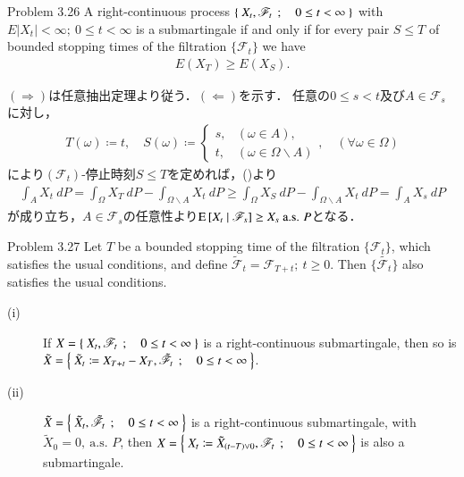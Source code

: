 	\begin{itembox}[l]{Problem 3.26}
		A right-continuous process $\left\{\ X_t,\mathscr{F}_t\ \, ; \quad 0 \leq t < \infty\ \right\}$ with $E|X_t| < \infty;\ 0 \leq t < \infty$
		is a submartingale if and only if for every pair $S \leq T$ of bounded stopping times of 
		the filtration $\{\mathscr{F}_t\}$ we have
		\begin{align}
			E(X_T) \geq E(X_S).
			\label{chapter_1_Problem_3_26_1}
		\end{align}
	\end{itembox}
	
	\begin{prf}
		$(\Rightarrow)$は任意抽出定理より従う．$(\Leftarrow)$を示す．
		任意の$0 \leq s < t$及び$A \in \mathscr{F}_s$に対し，
		\begin{align}
			T(\omega) \coloneqq t,
			\quad 
			S(\omega) \coloneqq
			\begin{cases}
				s, & (\omega \in A), \\
				t, & (\omega \in \Omega \backslash A)
			\end{cases},
			\quad (\forall \omega \in \Omega)
		\end{align}
		により$(\mathscr{F}_t)$-停止時刻$S \leq T$を定めれば，()より
		\begin{align}
			\int_A X_t\ dP = \int_\Omega X_T\ dP - \int_{\Omega \backslash A} X_t\ dP
			\geq \int_\Omega X_S\ dP - \int_{\Omega \backslash A} X_t\ dP
			= \int_A X_s\ dP
		\end{align}
		が成り立ち，$A \in \mathscr{F}_s$の任意性より$\operatorname{E} \left[ X_t \ \middle|\ \mathscr{F}_s \right] \geq X_s\ \mbox{a.s. $P$}$となる．
		\QED
	\end{prf}
	
	\begin{itembox}[l]{Problem 3.27}
		Let $T$ be a bounded stopping time of the filtration $\{\mathscr{F}_t\}$, which satisfies
		the usual conditions, and define $\tilde{\mathscr{F}}_t = \mathscr{F}_{T+t};\ t \geq 0$.
		Then $\{\tilde{\mathscr{F}_t}\}$ also satisfies the usual conditions.
		\begin{description}
			\item[(i)] If $X = \left\{\ X_t,\mathscr{F}_t\ \, ; \quad 0 \leq t < \infty\ \right\}$ is a right-continuous submartingale,
				then so is $\tilde{X} = \left\{\ \tilde{X}_t \coloneqq X_{T+t} - X_T,\tilde{\mathscr{F}}_t\ \, ; \quad 0 \leq t < \infty\ \right\}$.
			\item[(ii)] $\tilde{X} = \left\{\ \tilde{X}_t, \tilde{\mathscr{F}}_t\ \, ; \quad 0 \leq t < \infty\ \right\}$ is a right-continuous submartingale,
				with $\tilde{X}_0 = 0,\ \mbox{a.s. $P$}$, then
				$X = \left\{\ X_t \coloneqq \tilde{X}_{(t-T) \vee 0},\mathscr{F}_t\ \, ; \quad 0 \leq t < \infty\ \right\}$ is also a submartingale.
		\end{description}
	\end{itembox}
	
